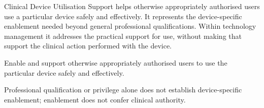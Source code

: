 Clinical Device Utilisation Support helps otherwise appropriately authorised users use a particular device safely and effectively. It represents the device-specific enablement needed beyond general professional qualifications. Within technology management it addresses the practical support for use, without making that support the clinical action performed with the device.



Enable and support otherwise appropriately authorised users to use the particular device safely and effectively.



Professional qualification or privilege alone does not establish device-specific enablement; enablement does not confer clinical authority.


